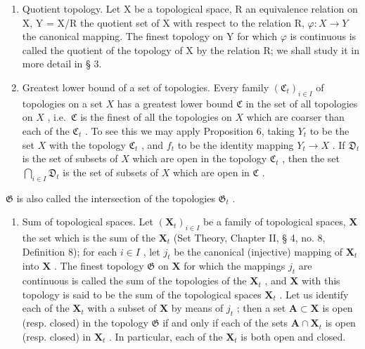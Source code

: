 \begin{enumerate}
\def\labelenumi{\arabic{enumi})}
\item
  Quotient topology. Let X be a topological space, R an equivalence relation on X, Y = X/R the quotient set of X with respect to the relation R, \(\varphi: X \to Y\) the canonical mapping. The finest topology on Y for which \(\varphi\) is continuous is called the quotient of the topology of X by the relation R; we shall study it in more detail in § 3.
\item
  Greatest lower bound of a set of topologies. Every family \((\mathfrak{C}_t)_{i \in I}\) of topologies on a set \(X\) has a greatest lower bound \(\mathfrak{C}\) in the set of all topologies on \(X\) , i.e.~\(\mathfrak{C}\) is the finest of all the topologies on \(X\) which are coarser than each of the \(\mathfrak{C}_t\) . To see this we may apply Proposition 6, taking \(Y_t\) to be the set \(X\) with the topology \(\mathfrak{C}_t\) , and \(f_t\) to be the identity mapping \(Y_t \to X\) . If \(\mathfrak{D}_t\) is the set of subsets of \(X\) which are open in the topology \(\mathfrak{C}_t\) , then the set \(\bigcap_{i \in I} \mathfrak{D}_t\) is the set of subsets of \(X\) which are open in \(\mathfrak{C}\) .
\end{enumerate}

\(\mathfrak{G}\) is also called the intersection of the topologies \(\mathfrak{G}_{t}\) .

\begin{enumerate}
\def\labelenumi{\arabic{enumi})}
\setcounter{enumi}{2}
\tightlist
\item
  Sum of topological spaces. Let \((\mathbf{X}_t)_{i \in I}\) be a family of topological spaces, \(\mathbf{X}\) the set which is the sum of the \(\mathbf{X}_t\) (Set Theory, Chapter II, § 4, no. 8, Definition 8); for each \(i \in I\) , let \(j_t\) be the canonical (injective) mapping of \(\mathbf{X}_t\) into \(\mathbf{X}\) . The finest topology \(\mathfrak{G}\) on \(\mathbf{X}\) for which the mappings \(j_t\) are continuous is called the sum of the topologies of the \(\mathbf{X}_t\) , and \(\mathbf{X}\) with this topology is said to be the sum of the topological spaces \(\mathbf{X}_t\) . Let us identify each of the \(\mathbf{X}_t\) with a subset of \(\mathbf{X}\) by means of \(j_t\) ; then a set \(\mathbf{A} \subset \mathbf{X}\) is open (resp. closed) in the topology \(\mathfrak{G}\) if and only if each of the sets \(\mathbf{A} \cap \mathbf{X}_t\) is open (resp. closed) in \(\mathbf{X}_t\) . In particular, each of the \(\mathbf{X}_t\) is both open and closed.
\end{enumerate}

